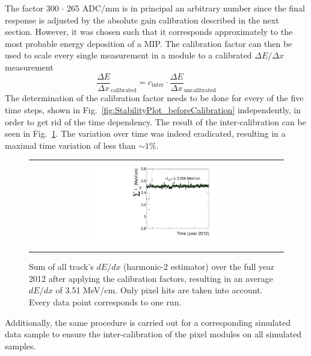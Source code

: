 The factor 300 $\cdot$ 265 ADC/mm is in principal an arbitrary number since the final response is adjusted by the absolute gain calibration described in the next section.
However, it was chosen such that it corresponds approximately to the most probable energy deposition of a MIP.
The calibration factor can then be used to scale every single measurement in a module to a calibrated $\Delta E/\Delta x$ measurement
\begin{equation*}
\frac{\Delta E}{\Delta x}_{\text{calibrated}}=c_{\text{inter}} \cdot \frac{\Delta E}{\Delta x}_{\text{uncalibrated}}
\end{equation*}
The determination of the calibration factor needs to be done for every of the five time steps, shown in Fig.~\ref{fig:StabilityPlot_beforeCalibration} independently, in order to get rid of the time dependency. 
The result of the inter-calibration can be seen in Fig.~\ref{fig:StabilityPlot_afterCalibration}.
The variation over time was indeed eradicated, resulting in a maximal time variation of less than $\sim1$\%.
\begin{figure}[!bt]
  \centering 
  \begin{tabular}{c}
  \includegraphics[width=0.49\textwidth]{figures/analysis/PixelCalibration/StabilityPlot_Pixel_afterCalibration_withoutStepFits_NEW.pdf}
  \end{tabular}
  \caption{Sum of all track's $dE/dx$ (harmonic-2 estimator) over the full year 2012 after applying the calibration factors, resulting in an average $dE/dx$ of 3.51 MeV/cm. Only pixel hits are taken into account. Every data point corresponds to one run.} 
  \label{fig:StabilityPlot_afterCalibration}
\end{figure}

Additionally, the same procedure is carried out for a corresponding simulated data sample to ensure the inter-calibration of the pixel modules on all simulated samples.





